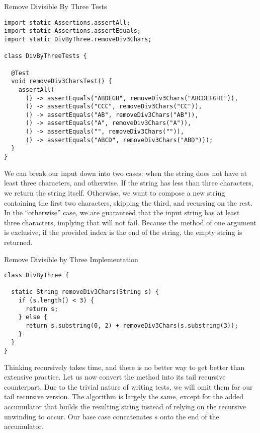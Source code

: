 \begin{cl}[]{Remove Divisible By Three Tests}
\begin{lstlisting}[language=MyJava]
import static Assertions.assertAll;
import static Assertions.assertEquals;
import static DivByThree.removeDiv3Chars;

class DivByThreeTests {

  @Test
  void removeDiv3CharsTest() {
    assertAll(
      () -> assertEquals("ABDEGH", removeDiv3Chars("ABCDEFGHI")),
      () -> assertEquals("CCC", removeDiv3Chars("CC")),
      () -> assertEquals("AB", removeDiv3Chars("AB")),
      () -> assertEquals("A", removeDiv3Chars("A")),
      () -> assertEquals("", removeDiv3Chars("")),
      () -> assertEquals("ABCD", removeDiv3Chars("ABD")));
  }
}
\end{lstlisting}
\end{cl}

We can break our input down into two cases: when the string does not have at least three characters, and otherwise. If the string has less than three characters, we return the string itself. Otherwise, we want to compose a new string containing the first two characters, skipping the third, and recursing on the rest. In the ``otherwise'' case, we are guaranteed that the input string has at least three characters, implying that  will not fail. Because the  method of one argument is exclusive, if the provided index is the end of the string, the empty string is returned.

\begin{cl}[]{Remove Divisible by Three Implementation}
\begin{lstlisting}[language=MyJava]
class DivByThree {

  static String removeDiv3Chars(String s) {
    if (s.length() < 3) {
      return s;
    } else {
      return s.substring(0, 2) + removeDiv3Chars(s.substring(3));
    }
  }
}
\end{lstlisting}
\end{cl}
Thinking recursively takes time, and there is no better way to get better than extensive practice. Let us now convert the method into its tail recursive counterpart. Due to the trivial nature of writing tests, we will omit them for our tail recursive version. The algorithm is largely the same, except for the added accumulator that builds the resulting string instead of relying on the recursive unwinding to occur. Our base case concatenates $s$ onto the end of the accumulator.

